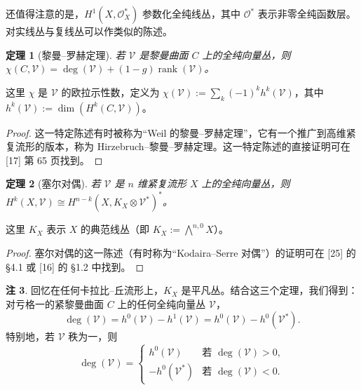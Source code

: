\documentclass[11pt,a4paper]{article}
\theoremstyle{plain}
\newtheorem{theorem}{定理}[section]
\theoremstyle{definition}
\newtheorem{remark}[theorem]{注}
\begin{document}

还值得注意的是，$H^1(X,\mathcal{O}_X^*)$ 参数化全纯线丛，其中 $\mathcal{O}^*$ 表示非零全纯函数层。对实线丛与复线丛可以作类似的陈述。

\begin{theorem}[黎曼–罗赫定理]
若 $\mathcal{V}$ 是黎曼曲面 $C$ 上的全纯向量丛，则 $\chi(C,\mathcal{V})=\deg(\mathcal{V})+(1-g)\operatorname{rank}(\mathcal{V})$。
\end{theorem}

这里 $\chi$ 是 $\mathcal{V}$ 的欧拉示性数，定义为 $\chi(\mathcal{V}):=\sum_k(-1)^kh^k(\mathcal{V})$，其中 $h^k(\mathcal{V}):=\dim(H^k(C,\mathcal{V}))$。

\begin{proof}
这一特定陈述有时被称为“Weil 的黎曼–罗赫定理”，它有一个推广到高维紧复流形的版本，称为 Hirzebruch–黎曼–罗赫定理。这一特定陈述的直接证明可在 [17] 第 65 页找到。
\end{proof}

\begin{theorem}[塞尔对偶]
若 $\mathcal{V}$ 是 $n$ 维紧复流形 $X$ 上的全纯向量丛，则 $H^k(X,\mathcal{V})\cong H^{n-k}(X,K_X\otimes\mathcal{V}^*)^*$。
\end{theorem}

这里 $K_X$ 表示 $X$ 的典范线丛（即 $K_X:=\bigwedge^{n,0}X$）。

\begin{proof}
塞尔对偶的这一陈述（有时称为“Kodaira–Serre 对偶”）的证明可在 [25] 的 §4.1 或 [16] 的 §1.2 中找到。
\end{proof}

\begin{remark}
回忆在任何卡拉比–丘流形上，$K_X$ 是平凡丛。结合这三个定理，我们得到：对亏格一的紧黎曼曲面 $C$ 上的任何全纯向量丛 $\mathcal{V}$，
\[
\deg(\mathcal{V})=h^0(\mathcal{V})-h^1(\mathcal{V})=h^0(\mathcal{V})-h^0(\mathcal{V}^*).
\]
特别地，若 $\mathcal{V}$ 秩为一，则
\[
\deg(\mathcal{V})=
\begin{cases}
h^0(\mathcal{V}) & \text{若 } \deg(\mathcal{V})>0,\\
-h^0(\mathcal{V}^*) & \text{若 } \deg(\mathcal{V})<0.
\end{cases}
\]
\end{remark}
\end{document}
